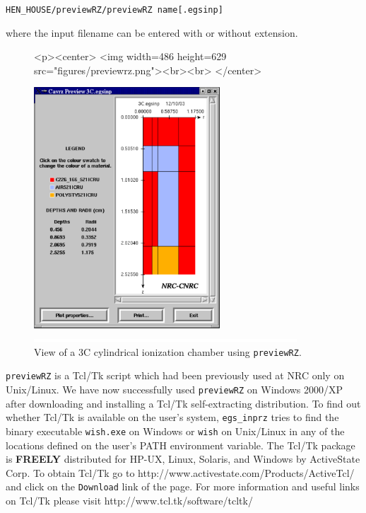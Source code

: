 \documentclass[12pt,twoside]{article}   %
\begin{document}
 {\tt HEN\_HOUSE/previewRZ/previewRZ name[.egsinp]}

\noindent where the input filename can be entered with or without extension. \\

\begin{figure}[h]
\begin{htmlonly}
\begin{rawhtml}
<p><center>
<img width=486 height=629 src="figures/previewrz.png"><br><br>
</center>
\end{rawhtml}
\end{htmlonly}
\begin{latexonly}
\begin{center}
\includegraphics[height=9cm]{figures/previewrz}
\end{center}
\end{latexonly}
\begin{center}
\includegraphics[height=1mm]{figures/fake2}
\end{center}
\caption{View of a 3C cylindrical ionization chamber using {\tt previewRZ}.}
\label{view}
\end{figure}

{\tt previewRZ} is a Tcl/Tk script
which had been previously used at NRC only on Unix/Linux. We have now successfully used
{\tt previewRZ} on Windows 2000/XP after downloading and installing a Tcl/Tk
self-extracting distribution.
To find out whether
Tcl/Tk is available on the user's system, {\tt egs\_inprz} tries to find the binary
executable {\tt wish.exe} on Windows or {\tt wish} on Unix/Linux in any of the locations
defined on the user's PATH environment
variable.
The Tcl/Tk package is {\bf FREELY} distributed for HP-UX, Linux,
Solaris, and Windows by ActiveState Corp.
To obtain  Tcl/Tk go to
{http://www.activestate.com/Products/ActiveTcl/}
and click on the {\tt Download} link of the page. For more information and useful links
on Tcl/Tk please visit
{http://www.tcl.tk/software/tcltk/}
\end{document}
